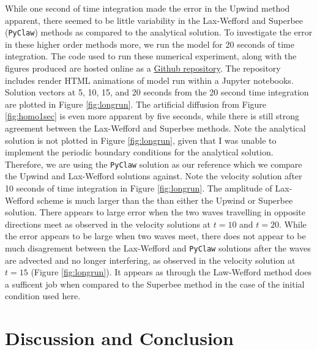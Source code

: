 \documentclass[review,onefignum,onetabnum]{siamart171218}
\begin{document}
While one second of time integration made the error in the Upwind method apparent, there seemed to be little variability in the Lax-Wefford and Superbee (\texttt{PyClaw}) methods as compared to the analytical solution. To investigate the error in these higher order methods more, we run the model for 20 seconds of time integration. The code used to run these numerical experiment, along with the figures produced are hosted online as a \href{https://github.com/andrewdnolan/MATH-709-Final-Project}{Github repository}. The repository includes render HTML animations of model run within a Jupyter notebooks. Solution vectors at 5, 10, 15, and 20 seconds from the 20 second time integration are plotted in Figure \ref{fig:longrun}. The artificial diffusion from Figure \ref{fig:homo1sec} is even more apparent by five seconds, while there is still strong agreement between the Lax-Wefford and Superbee methods. Note the analytical solution is not plotted in Figure \ref{fig:longrun}, given that I was unable to implement the periodic boundary conditions for the analytical solution. Therefore, we are using the \texttt{PyClaw} solution as our reference which we compare the Upwind and Lax-Wefford solutions against. Note the velocity solution after 10 seconds of time integration in Figure \ref{fig:longrun}. The amplitude of Lax-Wefford scheme is much larger than the than either the Upwind or Superbee solution. There appears to large error when the two waves travelling in opposite directions meet as observed in the velocity solutions at $t=10$ and $t=20$. While the error appears to be large when two waves meet, there does not appear to be much disagrement between the Lax-Wefford and \texttt{PyClaw} solutions after the waves are advected and no longer interfering, as observed in the velocity solution at $t=15$ (Figure \ref{fig:longrun}).  It appears as through the Law-Wefford method does a sufficent job when compared to the Superbee method in the case of the initial condition used here. 

\section{Discussion and Conclusion}
\end{document}
